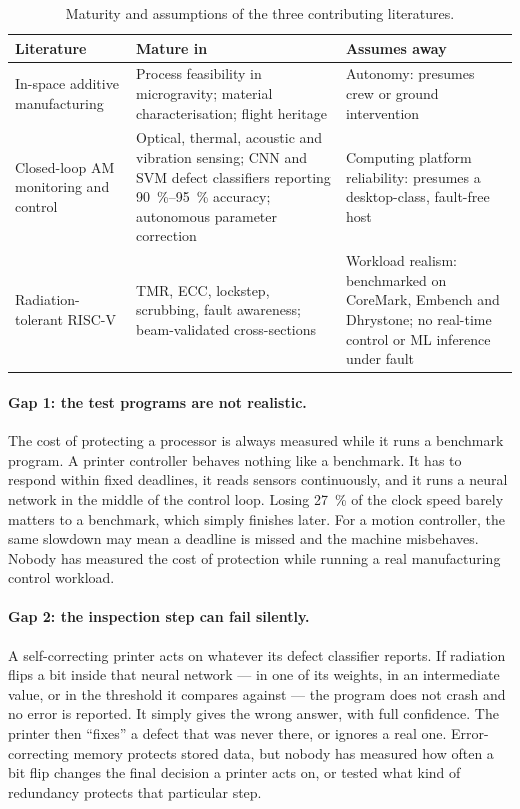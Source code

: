 \documentclass[11pt,a4paper]{article}
\begin{document}
\begin{table}[htbp]
\centering
\caption{Maturity and assumptions of the three contributing literatures.}
\label{tab:gap}
\small
\begin{tabularx}{\textwidth}{@{}L{3.0cm} X X@{}}
\toprule
\textbf{Literature} & \textbf{Mature in} & \textbf{Assumes away} \\
\midrule
In-space additive manufacturing &
Process feasibility in microgravity; material characterisation; flight heritage
\cite{prater2019zerog,asme2023review,technologies2026review} &
Autonomy: presumes crew or ground intervention \\[2pt]
Closed-loop AM monitoring and control &
Optical, thermal, acoustic and vibration sensing; CNN and SVM defect classifiers
reporting \SIrange{90}{95}{\percent} accuracy; autonomous parameter correction
\cite{fff_monitoring_review,saluja2020warping,cirp2024closedloop,anomaly_fff_ml2023} &
Computing platform reliability: presumes a desktop-class, fault-free host \\[2pt]
Radiation-tolerant RISC-V &
TMR, ECC, lockstep, scrubbing, fault awareness; beam-validated cross-sections
\cite{wilson2019neutron,electronics2023faultawareness,noelv_proton,trikarenos2023} &
Workload realism: benchmarked on CoreMark, Embench and Dhrystone; no real-time
control or ML inference under fault \\
\bottomrule
\end{tabularx}
\end{table}

\paragraph{Gap 1: the test programs are not realistic.}
The cost of protecting a processor is always measured while it runs a benchmark
program. A printer controller behaves nothing like a benchmark. It has to respond
within fixed deadlines, it reads sensors continuously, and it runs a neural
network in the middle of the control loop. Losing \SI{27}{\percent} of the clock
speed barely matters to a benchmark, which simply finishes later. For a motion
controller, the same slowdown may mean a deadline is missed and the machine
misbehaves. Nobody has measured the cost of protection while running a real
manufacturing control workload.

\paragraph{Gap 2: the inspection step can fail silently.}
A self-correcting printer acts on whatever its defect classifier reports. If
radiation flips a bit inside that neural network --- in one of its weights, in an
intermediate value, or in the threshold it compares against --- the program does
not crash and no error is reported. It simply gives the wrong answer, with full
confidence. The printer then ``fixes'' a defect that was never there, or ignores a
real one. Error-correcting memory protects stored data, but nobody has measured
how often a bit flip changes the final decision a printer acts on, or tested what
kind of redundancy protects that particular step.
\end{document}
